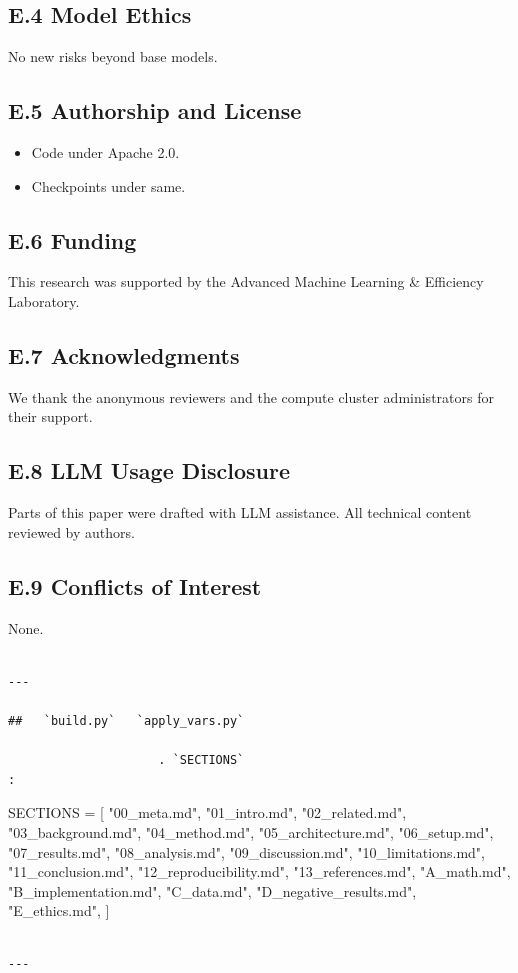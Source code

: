 \subsection{E.4 Model Ethics}

No new risks beyond base models.

\subsection{E.5 Authorship and License}

\begin{itemize}
\item Code under Apache 2.0.
\item Checkpoints under same.

\end{itemize}
\subsection{E.6 Funding}

This research was supported by the Advanced Machine Learning \& Efficiency Laboratory.

\subsection{E.7 Acknowledgments}

We thank the anonymous reviewers and the compute cluster administrators for their support.

\subsection{E.8 LLM Usage Disclosure}

Parts of this paper were drafted with LLM assistance. All technical content 
reviewed by authors.

\subsection{E.9 Conflicts of Interest}

None.
\begin{lstlisting}

---

##   `build.py`   `apply_vars.py`

                     . `SECTIONS`                                     :

\end{lstlisting}
SECTIONS = [
    "00\_meta.md", "01\_intro.md", "02\_related.md", "03\_background.md",
    "04\_method.md", "05\_architecture.md", "06\_setup.md", "07\_results.md",
    "08\_analysis.md", "09\_discussion.md", "10\_limitations.md",
    "11\_conclusion.md", "12\_reproducibility.md", "13\_references.md",
    "A\_math.md", "B\_implementation.md", "C\_data.md",
    "D\_negative\_results.md", "E\_ethics.md",
]
\begin{lstlisting}

---
\end{lstlisting}